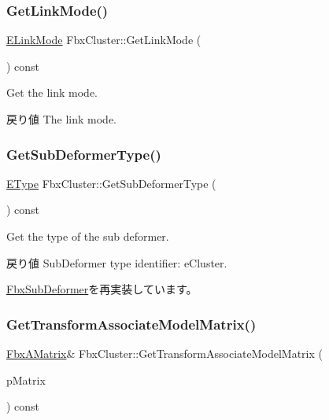 \subsubsection{\texorpdfstring{Get\+Link\+Mode()}{GetLinkMode()}}
{\footnotesize\ttfamily \hyperlink{class_fbx_cluster_aaa2afaedfd33eda65c46bb5a3d04dab0}{E\+Link\+Mode} Fbx\+Cluster\+::\+Get\+Link\+Mode (\begin{DoxyParamCaption}{ }\end{DoxyParamCaption}) const}

Get the link mode. \begin{DoxyReturn}{戻り値}
The link mode. 
\end{DoxyReturn}
\mbox{\label{class_fbx_cluster_aa395931c54c7a8b7e23b1be50b32a1d6}} 
\subsubsection{\texorpdfstring{Get\+Sub\+Deformer\+Type()}{GetSubDeformerType()}}
{\footnotesize\ttfamily \hyperlink{class_fbx_sub_deformer_aed7eba8aabbb8b25a8ddbab127d67319}{E\+Type} Fbx\+Cluster\+::\+Get\+Sub\+Deformer\+Type (\begin{DoxyParamCaption}{ }\end{DoxyParamCaption}) const\hspace{0.3cm}{\ttfamily [virtual]}}

Get the type of the sub deformer. \begin{DoxyReturn}{戻り値}
Sub\+Deformer type identifier\+: e\+Cluster. 
\end{DoxyReturn}


\hyperlink{class_fbx_sub_deformer_a1a1998b98ca03598bc6bec630e1aaa97}{Fbx\+Sub\+Deformer}を再実装しています。

\mbox{\label{class_fbx_cluster_a47228a06a38257e983f42a349a2d3fb0}} 
\subsubsection{\texorpdfstring{Get\+Transform\+Associate\+Model\+Matrix()}{GetTransformAssociateModelMatrix()}}
{\footnotesize\ttfamily \hyperlink{class_fbx_a_matrix}{Fbx\+A\+Matrix}\& Fbx\+Cluster\+::\+Get\+Transform\+Associate\+Model\+Matrix (\begin{DoxyParamCaption}\item[{\hyperlink{class_fbx_a_matrix}{Fbx\+A\+Matrix} \&}]{p\+Matrix }\end{DoxyParamCaption}) const}

